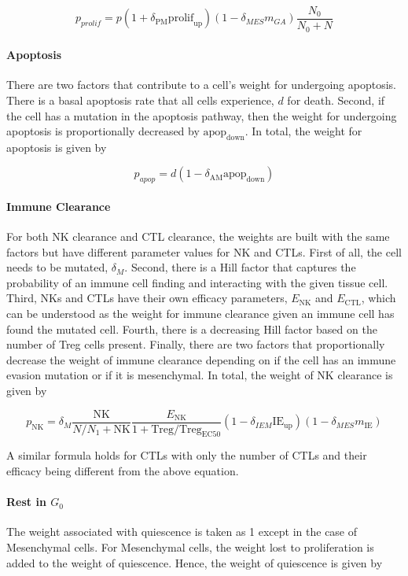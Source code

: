\documentclass[11pt, a4paper, preprint]{article}
\begin{document}
$$ p_{prolif} = p(1+\delta_{\text{PM}}\text{prolif}_{\text{up}})(1-\delta_{MES}m_{GA})\frac{N_0}{N_0+N} $$

\paragraph{Apoptosis}
There are two factors that contribute to a cell's weight for undergoing apoptosis.
There is a basal apoptosis rate that all cells experience, $d$ for death.
Second, if the cell has a mutation in the apoptosis pathway, then the weight for undergoing apoptosis is proportionally decreased by $\text{apop}_{\text{down}}$.
In total, the weight for apoptosis is given by 

$$ p_{apop} = d(1-\delta_{\text{AM}}\text{apop}_{\text{down}}) $$

\paragraph{Immune Clearance}
For both NK clearance and CTL clearance, the weights are built with the same factors but have different parameter values for NK and CTLs.
First of all, the cell needs to be mutated, $\delta_M$.
Second, there is a Hill factor that captures the probability of an immune cell finding and interacting with the given tissue cell.
Third, NKs and CTLs have their own efficacy parameters, $E_{\text{NK}}$ and $E_{\text{CTL}}$, which can be understood as the weight for immune clearance given an immune cell has found the mutated cell.
Fourth, there is a decreasing Hill factor based on the number of Treg cells present.
Finally, there are two factors that proportionally decrease the weight of immune clearance depending on if the cell has an immune evasion mutation or if it is mesenchymal.
In total, the weight of NK clearance is given by

$$ p_{\text{NK}} =\delta_M \frac{\text{NK}}{N/N_{1}+\text{NK}}  \frac{E_{\text{NK}}}{1+\text{Treg}/\text{Treg}_{\text{EC50}}} (1-\delta_{IEM}\text{IE}_{\text{up}})(1-\delta_{MES}m_{\text{IE}}) $$

A similar formula holds for CTLs with only the number of CTLs and their efficacy being different from the above equation.


\paragraph{Rest in $G_0$} 
The weight associated with quiescence is taken as 1 except in the case of Mesenchymal cells.
For Mesenchymal cells, the weight lost to proliferation is added to the weight of quiescence.
Hence, the weight of quiescence is given by
\end{document}
